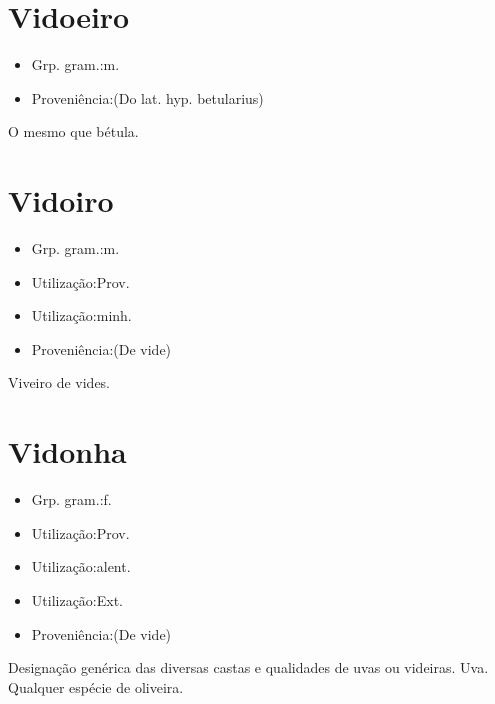 \documentclass{article}
\begin{document}
\section{Vidoeiro}
\begin{itemize}
\item {Grp. gram.:m.}
\end{itemize}
\begin{itemize}
\item {Proveniência:(Do lat. hyp. \textunderscore betularius\textunderscore )}
\end{itemize}
O mesmo que \textunderscore bétula\textunderscore .
\section{Vidoiro}
\begin{itemize}
\item {Grp. gram.:m.}
\end{itemize}
\begin{itemize}
\item {Utilização:Prov.}
\end{itemize}
\begin{itemize}
\item {Utilização:minh.}
\end{itemize}
\begin{itemize}
\item {Proveniência:(De \textunderscore vide\textunderscore )}
\end{itemize}
Viveiro de vides.
\section{Vidonha}
\begin{itemize}
\item {Grp. gram.:f.}
\end{itemize}
\begin{itemize}
\item {Utilização:Prov.}
\end{itemize}
\begin{itemize}
\item {Utilização:alent.}
\end{itemize}
\begin{itemize}
\item {Utilização:Ext.}
\end{itemize}
\begin{itemize}
\item {Proveniência:(De \textunderscore vide\textunderscore )}
\end{itemize}
Designação genérica das diversas castas e qualidades de uvas ou videiras.
Uva.
Qualquer espécie de oliveira.
\end{document}
